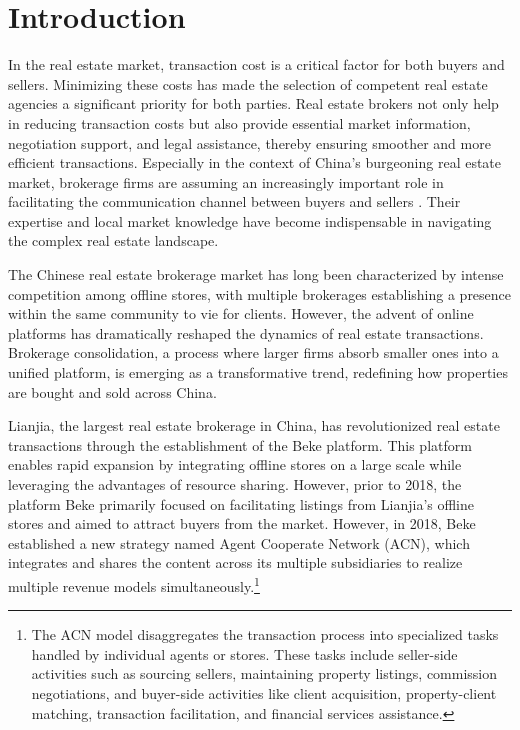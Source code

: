 \documentclass[12pt]{article}
\begin{document}
\clearpage
\egroup
\setcounter{page}{1}



\section{Introduction \label{sec:introduction}}

\noindent

In the real estate market, transaction cost is a critical factor for both buyers and sellers. Minimizing these costs has made the selection of competent real estate agencies a significant priority for both parties. Real estate brokers not only help in reducing transaction costs but also provide essential market information, negotiation support, and legal assistance, thereby ensuring smoother and more efficient transactions. Especially in the context of China's burgeoning real estate market, brokerage firms are assuming an increasingly important role in facilitating the communication channel between buyers and sellers \citep{glaeser_real_2017}. Their expertise and local market knowledge have become indispensable in navigating the complex real estate landscape.

The Chinese real estate brokerage market has long been characterized by intense competition among offline stores, with multiple brokerages establishing a presence within the same community to vie for clients. However, the advent of online platforms has dramatically reshaped the dynamics of real estate transactions. Brokerage consolidation, a process where larger firms absorb smaller ones into a unified platform, is emerging as a transformative trend, redefining how properties are bought and sold across China.

Lianjia, the largest real estate brokerage in China, has revolutionized real estate transactions through the establishment of the Beke platform. This platform enables rapid expansion by integrating offline stores on a large scale while leveraging the advantages of resource sharing. However, prior to 2018, the platform Beke primarily focused on facilitating listings from Lianjia's offline stores and aimed to attract buyers from the market. However, in 2018, Beke established a new strategy named Agent Cooperate Network (ACN), which integrates and shares the content across its multiple subsidiaries to realize multiple revenue models simultaneously.\footnote{The ACN model disaggregates the transaction process into specialized tasks handled by individual agents or stores. These tasks include seller-side activities such as sourcing sellers, maintaining property listings, commission negotiations, and buyer-side activities like client acquisition, property-client matching, transaction facilitation, and financial services assistance.}
\end{document}
